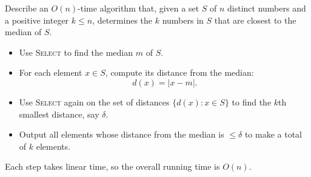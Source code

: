 \item[\textbf{Exercise 9.3-9}]
Describe an $O(n)$-time algorithm that, given a set $S$ of $n$ distinct numbers
and a positive integer $k \le n$, determines the $k$ numbers in $S$ that are
closest to the median of $S$.

\Solution

\begin{itemize}
    \item Use \textsc{Select} to find the median $m$ of $S$.
    
    \item For each element $x \in S$, compute its distance from the median:
    \[
        d(x) = |x - m|.
    \]

    \item Use \textsc{Select} again on the set of distances $\{d(x) : x \in S\}$
    to find the $k$th smallest distance, say $\delta$.

    \item Output all elements whose distance from the median is $\le \delta$ to
    make a total of $k$ elements.
\end{itemize}

Each step takes linear time, so the overall running time is $O(n)$.
